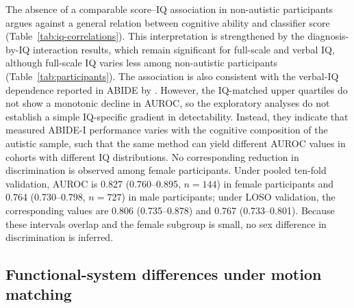 The absence of a comparable score--IQ association in non-autistic participants argues against a general relation between cognitive ability and classifier score (Table~\ref{tab:iq-correlations}). This interpretation is strengthened by the diagnosis-by-IQ interaction results, which remain significant for full-scale and verbal IQ, although full-scale IQ varies less among non-autistic participants (Table~\ref{tab:participants}). The association is also consistent with the verbal-IQ dependence reported in ABIDE by \citet{Nielsenetal2013}. However, the IQ-matched upper quartiles do not show a monotonic decline in AUROC, so the exploratory analyses do not establish a simple IQ-specific gradient in detectability. Instead, they indicate that measured ABIDE-I performance varies with the cognitive composition of the autistic sample, such that the same method can yield different AUROC values in cohorts with different IQ distributions. No corresponding reduction in discrimination is observed among female participants. Under pooled ten-fold validation, AUROC is 0.827 (0.760--0.895, $n=144$) in female participants and 0.764 (0.730--0.798, $n=727$) in male participants; under LOSO validation, the corresponding values are 0.806 (0.735--0.878) and 0.767 (0.733--0.801). Because these intervals overlap and the female subgroup is small, no sex difference in discrimination is inferred.

\subsection{Functional-system differences under motion matching}
\label{subsec:results-system-differences}

